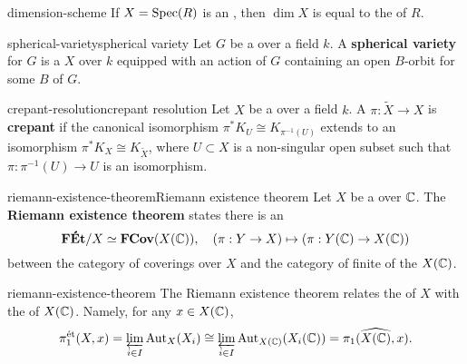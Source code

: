 \begin{example}{dimension-scheme}
    If $X = \operatorname{Spec}(R)$ is an , then $\dim X$ is equal to the  of $R$.
\end{example}

\begin{topic}{spherical-variety}{spherical variety}
    Let $G$ be a   over a field $k$. A \textbf{spherical variety} for $G$ is a  $X$ over $k$ equipped with an action of $G$ containing an open  $B$-orbit for some  $B$ of $G$.
\end{topic}

\begin{topic}{crepant-resolution}{crepant resolution}
    Let $X$ be a  over a field $k$. A  $\pi : \widetilde{X} \to X$ is \textbf{crepant} if the canonical isomorphism $\pi^* K_U \cong K_{\pi^{-1}(U)}$ extends to an isomorphism $\pi^* K_X \cong K_{\widetilde{X}}$, where $U \subset X$ is a non-singular open subset such that $\pi : \pi^{-1}(U) \to U$ is an isomorphism.
\end{topic}

\begin{topic}{riemann-existence-theorem}{Riemann existence theorem}
    Let $X$ be a    over $\mathbb{C}$. The \textbf{Riemann existence theorem} states there is an 
    \[ \textbf{FÉt}/X \simeq \textbf{FCov}(X(\mathbb{C})), \quad (\pi : Y \to X) \mapsto (\pi : Y(\mathbb{C}) \to X(\mathbb{C})) \]
    between the category of   coverings over $X$ and the category of finite  of the  $X(\mathbb{C})$.
\end{topic}

\begin{example}{riemann-existence-theorem}
    The Riemann existence theorem relates the  of $X$ with the  of $X(\mathbb{C})$. Namely, for any $x \in X(\mathbb{C})$,
    \[ \pi^\textup{ét}_1(X, x) = \varprojlim_{i \in I} \operatorname{Aut}_X(X_i) \cong \varprojlim_{i \in I} \operatorname{Aut}_{X(\mathbb{C})}(X_i(\mathbb{C})) = \widehat{\pi_1(X(\mathbb{C}), x)} . \]
\end{example}

